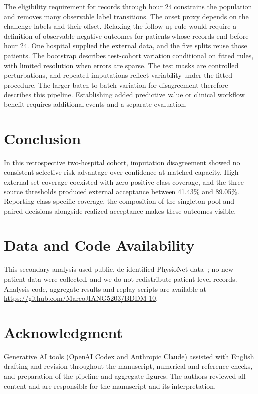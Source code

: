 \documentclass[conference]{IEEEtran}
\begin{document}
The eligibility requirement for records through hour 24 constrains the population and removes many observable label transitions. The onset proxy depends on the challenge labels and their offset. Relaxing the follow-up rule would require a definition of observable negative outcomes for patients whose records end before hour 24. One hospital supplied the external data, and the five splits reuse those patients. The bootstrap describes test-cohort variation conditional on fitted rules, with limited resolution when errors are sparse. The test masks are controlled perturbations, and repeated imputations reflect variability under the fitted procedure. The larger batch-to-batch variation for disagreement therefore describes this pipeline. Establishing added predictive value or clinical workflow benefit requires additional events and a separate evaluation.

\section{Conclusion}

In this retrospective two-hospital cohort, imputation disagreement showed no consistent selective-risk advantage over confidence at matched capacity. High external set coverage coexisted with zero positive-class coverage, and the three source thresholds produced external acceptance between 41.43\% and 89.05\%. Reporting class-specific coverage, the composition of the singleton pool and paired decisions alongside realized acceptance makes these outcomes visible.

\section*{Data and Code Availability}

This secondary analysis used public, de-identified PhysioNet data~\cite{reyna2020,reyna2019data}; no new patient data were collected, and we do not redistribute patient-level records. Analysis code, aggregate results and replay scripts are available at \url{https://github.com/MarcoJIANG5203/BDDM-10}.

\section*{Acknowledgment}

Generative AI tools (OpenAI Codex and Anthropic Claude) assisted with English drafting and revision throughout the manuscript, numerical and reference checks, and preparation of the pipeline and aggregate figures. The authors reviewed all content and are responsible for the manuscript and its interpretation.
\end{document}

